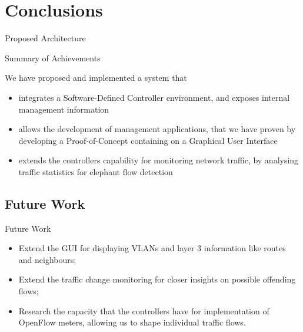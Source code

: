 \documentclass[aspectratio=43]{beamer}
\begin{document}
\section{Conclusions}
\begin{frame}[plain]
    \centering
        \Huge{Proposed Architecture}
\end{frame}


\begin{frame}{Summary of Achievements}
    \item We have proposed and implemented a system that
    \begin{itemize}
        \item integrates a Software-Defined Controller environment, and exposes internal
            management information
        \item allows the development of management applications, that we have proven 
            by developing a Proof-of-Concept containing on a Graphical User Interface
        \item extends the controllers capability for monitoring network traffic, 
            by analysing traffic statistics for elephant flow detection
    \end{itemize}
\end{frame}

\subsection{Future Work}

\begin{frame}{Future Work}
    \begin{itemize}
        \item Extend the GUI for displaying VLANs and layer 3 information like routes and neighbours;
        \item Extend the traffic change monitoring for closer insights on possible offending flows;
        \item Research the capacity that the controllers have for implementation of OpenFlow meters,
            allowing us to shape individual traffic flows.
    \end{itemize}
\end{frame}
\end{document}
